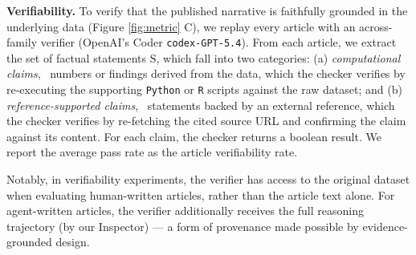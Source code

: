 \textbf{Verifiability.}
To verify that the published narrative is faithfully grounded in the underlying data (Figure \ref{fig:metric} C), we replay every article with an across-family verifier (OpenAI’s Coder \texttt{codex-GPT-5.4}). 
From each article, we extract the set of factual statements $\mathrm{S}$, which fall into two categories:
(a) \emph{computational claims}, \ie~numbers or findings derived from the data, which the checker verifies by re-executing the supporting \texttt{Python} or \texttt{R} scripts against the raw dataset;
and (b) \emph{reference-supported claims}, \ie~statements backed by an external reference, which the checker verifies by re-fetching the cited source URL and confirming the claim against its content.
For each claim, the checker returns a boolean result. We report the average pass rate as the article verifiability rate.

Notably, in verifiability experiments, the verifier has access to the original dataset when evaluating human-written articles, rather than the article text alone. For agent-written articles, the verifier additionally receives the full reasoning trajectory (by our Inspector) — a form of provenance made possible by evidence-grounded design.